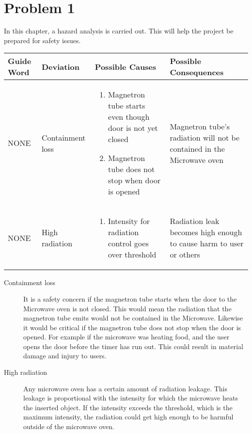 \chapter{Problem 1}
\label{chp:one}


In this chapter, a hazard analysis is carried out. This will help the project be prepared for safety issues. 

\begin{center}
	\begin{tabular}{p{2.1cm} | p{2.9cm} | p{5cm} | p{4cm} }
		Guide Word & Deviation & Possible Causes & Possible Consequences \\\hline
		NONE & Containment loss & 
		\begin{enumerate}
			\item Magnetron tube starts even though door is not yet closed 
			\item Magnetron tube does not stop when door is opened 
		\end{enumerate}
		 & Magnetron tube's radiation will not be contained in the Microwave oven \\\hline
		
		NONE & High radiation & 
		\begin{enumerate}
			\item Intensity for radiation control goes over threshold 
		\end{enumerate}
		& Radiation leak becomes high enough to cause harm to user or others\\\hline
	\end{tabular}
\end{center}

\begin{description}
	\item[Containment loss] It is a safety concern if the magnetron tube starts when the door to the Microwave oven is not closed. This would mean the radiation that the magnetron tube emits would not be contained in the Microwave. Likewise it would be critical if the magnetron tube does not stop when the door is opened. For example if the microwave was heating food, and the user opens the door before the timer has run out. This could result in material damage and injury to users.
	
	\item[High radiation] Any microwave oven has a certain amount of radiation leakage. This leakage is proportional with the intensity for which the microwave heats the inserted object. If the intensity exceeds the threshold, which is the maximum intensity, the radiation could get high enough to be harmful outside of the microwave oven. 
\end{description}
